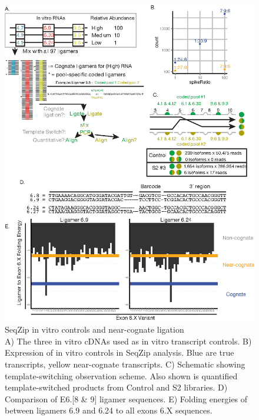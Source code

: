 		\begin{figure} %
			\centering 
			\includegraphics{Figures/SeqZipPaper/Roy2014FigS2.eps}
			\caption[SeqZip in vitro \dscam{} controls and near-cognate ligation]
			{
				SeqZip in vitro \dscam{} controls and near-cognate ligation\\[0.25cm]
				A) The three in vitro cDNAs used as in vitro transcript controls. B) Expression of in vitro controls in SeqZip analysis. Blue are true transcripts, yellow near-cognate transcripts. C) Schematic showing template-switching observation scheme. Also shown is quantified template-switched products from Control and S2 libraries. D) Comparison of E6.[8 \& 9] ligamer sequences. E) Folding energies of between ligamers 6.9 and 6.24 to all exons 6.X sequences.
				}
			\label{SeqZipPaper:fig:Roy2014 S2}
			\end{figure}

